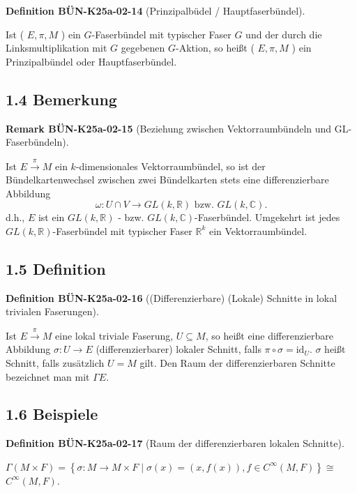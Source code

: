 \documentclass[10pt, letterpaper]{article}
\newcommand{\CustomHeading}[3]{%
  \par\medskip\noindent%
  \textbf{#1 #2} \textnormal{(#3)}.\enskip%
}
\newenvironment{DEF}[2]{\begin{unitbox}\CustomHeading{Definition}{#1}{#2}}{\end{unitbox}}
\newenvironment{REM}[2]{\begin{unitbox}\CustomHeading{Remark}{#1}{#2}}{\end{unitbox}}
\begin{document}
\begin{DEF}{BÜN-K25a-02-14}{Prinzipalbüdel / Hauptfaserbündel}
Ist ( $E, \pi, M$ ) ein $G$-Faserbündel mit typischer Faser $G$ und der durch die Linksmultiplikation mit $G$ gegebenen $G$-Aktion, so heißt ( $E, \pi, M$ ) ein Prinzipalbündel oder Hauptfaserbündel.
\end{DEF}



\subsection*{1.4 Bemerkung}


\begin{REM}{BÜN-K25a-02-15}{Beziehung zwischen Vektorraumbündeln und GL-Faserbündeln}
Ist $E \xrightarrow{\pi} M$ ein $k$-dimensionales Vektorraumbündel, so ist der Bündelkartenwechsel zwischen zwei Bündelkarten stets eine differenzierbare Abbildung
$$
\omega: U \cap V \rightarrow G L(k, \mathbb{R}) \text { bzw. } G L(k, \mathbb{C}) .
$$
d.h., $E$ ist ein $G L(k, \mathbb{R})$ - bzw. $G L(k, \mathbb{C})$-Faserbündel. Umgekehrt ist jedes $G L(k, \mathbb{R})$-Faserbündel mit typischer Faser $\mathbb{R}^{k}$ ein Vektorraumbündel.
\end{REM}

\subsection*{1.5 Definition}

\begin{DEF}{BÜN-K25a-02-16}{(Differenzierbare) (Lokale) Schnitte in lokal trivialen Faserungen}
Ist $E \xrightarrow{\pi} M$ eine lokal triviale Faserung, $U \subseteq M$, so heißt eine differenzierbare Abbildung $\sigma: U \rightarrow E$ (differenzierbarer) lokaler Schnitt, falls $\pi \circ \sigma=\mathrm{id}_{U}$. $\sigma$ heißt Schnitt, falls zusätzlich $U=M$ gilt. Den Raum der differenzierbaren Schnitte bezeichnet man mit $\Gamma E$.
\end{DEF}



\subsection*{1.6 Beispiele}

\begin{DEF}{BÜN-K25a-02-17}{Raum der differenzierbaren lokalen Schnitte}
$\Gamma(M \times F)=\left\{\sigma: M \rightarrow M \times F \mid \sigma(x)=(x, f(x)), f \in C^{\infty}(M, F)\right\} \cong$ $C^{\infty}(M, F)$.
\end{DEF}
\end{document}
